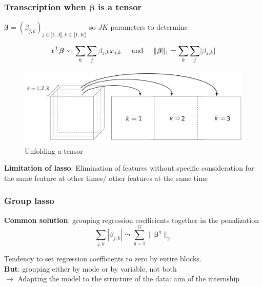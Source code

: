 \documentclass{beamer}
\begin{document}
\begin{frame}
    \frametitle{Transcription when $\bm{\beta}$ is a tensor}
    \begin{center}
    $\bm{\beta} = (\beta_{j,k})_{j \in \llbracket 1, J\rrbracket, k \in \llbracket 1, K\rrbracket}$ so $JK$ parameters to determine\\[15 pt]
    \end{center}
    $$x^T \bm{\beta} \leadsto \sum\limits_{k}\sum\limits_{j}  \beta_{j,k} x_{j,k} \hspace{0.5 cm} \text{and} \hspace{0.5 cm} \lVert \bm{\beta} \rVert_1 = \sum\limits_{k}\sum\limits_{j} \lvert \beta_{j,k} \rvert$$
    \begin{figure}
        \centering
        \includegraphics[scale = 0.15]{images/deplier.png}
        \caption{Unfolding a tensor}
    \end{figure}
    \textbf{Limitation of lasso}: Elimination of features without specific consideration for the same feature at other times/ other features at the same time
    
\end{frame}

\begin{frame}
    \frametitle{Group lasso}

 \textbf{Common solution}: grouping regression coefficients together in the penalization
 $$ \sum\limits_{j,k} |\beta_{j,k}|\leadsto \sum\limits_{g = 1}^G \lVert \bm{\beta}^g \rVert_2 $$

 Tendency to set regression coefficients to zero by entire blocks.\\[20 pt]

\textbf{But}: grouping either by mode or by variable, not both\\  $\rightarrow$ Adapting the model to the structure of the data: aim of the internship
    

\end{frame}
\end{document}
